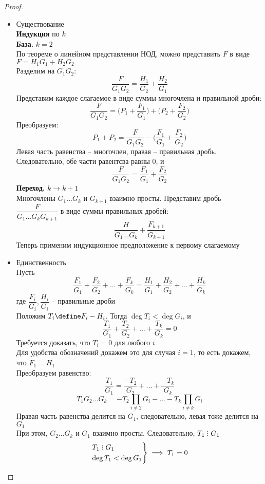 \begin{proof}
	\hfill
	\begin{itemize}
		\item Существование \\
		\textbf{Индукция} по $k$ \\
		\textbf{База.} $k = 2$ \\
		По теореме о линейном представлении НОД, можно представить $F$ в виде $F = H_1G_1 + H_2G_2$ \\
		Разделим на $G_1G_2$:
		$$ \frac{F}{G_1G_2} = \frac{H_1}{G_2} + \frac{H_2}{G_1} $$
		Представим каждое слагаемое в виде суммы многочлена и правильной дроби:
		$$ \frac{F}{G_1G_2} = \bigg( P_1 + \frac{F_1}{G_1} \bigg) + \bigg(P_2 + \frac{F_2}{G_2} \bigg) $$
		Преобразуем:
		$$ P_1 + P_2 = \frac{F}{G_1G_2} - \bigg( \frac{F_1}{G_1} + \frac{F_2}{G_2} \bigg) $$
		Левая часть равенства -- многочлен, правая -- правильная дробь. Следовательно, обе части равентсва равны 0, и
		$$ \frac{F}{G_1G_2} = \frac{F_1}{G_1} + \frac{F_2}{G_2} $$
		\textbf{Переход.} $k \to k + 1$ \\
		Многочлены $G_1...G_k$ и $G_{k + 1}$ взаимно просты. Представим дробь $\dfrac{F}{G_1...G_kG_{k + 1}}$ в виде суммы правильных дробей:
		$$ \frac{H}{G_1...G_k} + \frac{F_{k + 1}}{G_{k + 1}} $$
		Теперь применим индукционное предположение к первому слагаемому
		\item Единственность \\
		Пусть
		$$ \frac{F_1}{G_1} + \frac{F_2}{G_2} + ... + \frac{F_k}{G_k} = \frac{H_1}{G_1} + \frac{H_2}{G_2} + ... + \frac{H_k}{G_k} $$
		где $\dfrac{F_i}{G_i}, \dfrac{H_i}{G_i}$ -- правильные дроби \\
		Положим $T_i \define F_i - H_i$. Тогда $\deg T_i < \deg G_i$, и
		$$ \frac{T_1}{G_1} + \frac{T_2}{G_2} + ... + \frac{T_k}{G_k} = 0 $$
		Требуется доказать, что $T_i = 0$ для любого $i$ \\
		Для удобства обозначений докажем это для случая $i = 1$, то есть докажем, что $F_1 = H_1$ \\
		Преобразуем равенство:
		$$ \frac{T_1}{G_1} = \frac{-T_2}{G_2} + ... + \frac{-T_k}{G_k} $$
		$$ T_1G_2...G_k = -T_2 \prod_{i \ne 2}G_i - ... - T_k \prod_{i \ne k}G_i $$
		Правая часть равенства делится на $G_1$, следовательно, левая тоже делится на $G_1$ \\
		При этом, $G_2...G_k$ и $G_1$ взаимно просты. Следовательно, $T_1 \divby G_1$
		$$ \begin{rcases}
		   	T_1 \divby G_1 \\
			\deg T_1 < \deg G_1
		   \end{rcases} \implies T_1 = 0 $$
	\end{itemize}
\end{proof}

